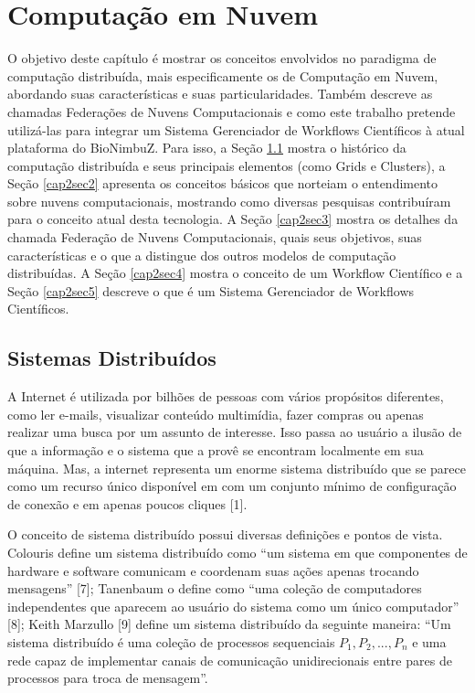 
\chapter{Computação em Nuvem} \label{cap2}

O objetivo deste capítulo é mostrar os conceitos envolvidos no paradigma de computação distribuída, mais especificamente os de Computação em Nuvem, abordando suas características e suas particularidades. Também descreve as chamadas Federações de Nuvens Computacionais e como este trabalho pretende utilizá-las para integrar um Sistema Gerenciador de Workflows Científicos à atual plataforma do BioNimbuZ. Para isso, a Seção \ref{cap2sec1} mostra o histórico da computação distribuída e seus principais elementos (como Grids e Clusters), a Seção \ref{cap2sec2} apresenta os conceitos básicos que norteiam o entendimento sobre nuvens computacionais, mostrando como diversas pesquisas contribuíram para o conceito atual desta tecnologia. A Seção \ref{cap2sec3} mostra os detalhes da chamada Federação de Nuvens Computacionais, quais seus objetivos, suas características e o que a distingue dos outros modelos de computação distribuídas. A Seção \ref{cap2sec4} mostra o conceito de um Workflow Científico e a Seção \ref{cap2sec5} descreve o que é um Sistema Gerenciador de Workflows Científicos.

\section{Sistemas Distribuídos} \label{cap2sec1}

A Internet é utilizada por bilhões de pessoas com vários propósitos diferentes, como ler e-mails, visualizar conteúdo multimídia, fazer compras ou apenas realizar uma busca por um assunto de interesse. Isso passa ao usuário a ilusão de que a informação e o sistema que a provê se encontram localmente em sua máquina. Mas, a internet representa um enorme sistema distribuído que se parece como um recurso único disponível em com um conjunto mínimo de configuração de conexão e em apenas poucos cliques [1].

O conceito de sistema distribuído possui diversas definições e pontos de vista. Colouris define um sistema distribuído como “um sistema em que componentes de hardware e software comunicam e coordenam suas ações apenas trocando mensagens” [7]; Tanenbaum o define como “uma coleção de computadores independentes que aparecem ao usuário do sistema como um único computador” [8]; Keith Marzullo [9] define um sistema distribuído da seguinte maneira: “Um sistema distribuído é uma coleção de processos sequenciais $P_1, P_2, ..., P_n$ e uma rede capaz de implementar canais de comunicação unidirecionais entre pares de processos para troca de mensagem”. 

